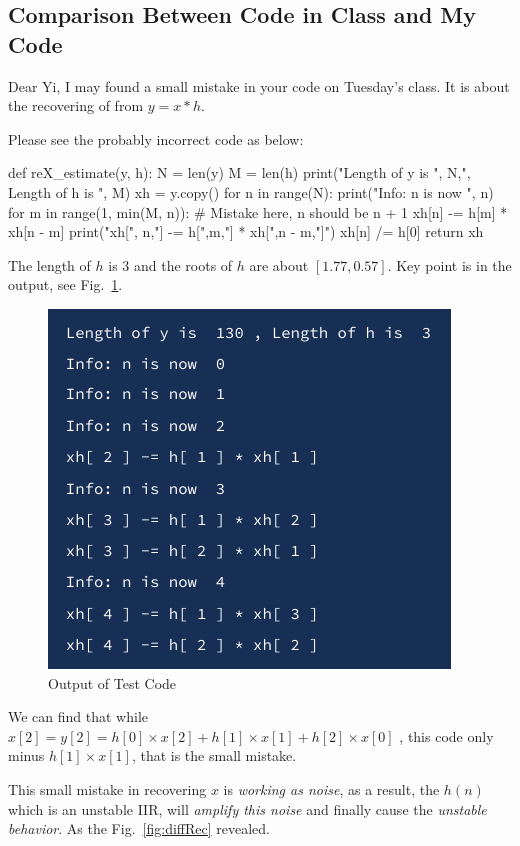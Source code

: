 \documentclass{article}
\begin{document}
\begin{appendices}
\section{Comparison Between Code in Class and My Code}
Dear Yi, I may found a small mistake in your code on Tuesday's class. It is about the recovering of
from $y = x * h$. 

Please see the probably incorrect code as below:
\begin{python}
def reX_estimate(y, h):
	N = len(y)
	M = len(h)
	print("Length of y is ", N,", Length of h is ", M)
	xh = y.copy()
	for n in range(N):
		print("Info: n is now ", n)
		for m in range(1, min(M, n)): # Mistake here, n should be n + 1
			xh[n] -= h[m] * xh[n - m]
			print("xh[", n,"] -= h[",m,"] * xh[",n - m,"]")
		xh[n] /= h[0]
	return xh
\end{python}

The length of $h$ is $3$ and the roots of $h$ are about $[1.77, 0.57]$. Key point is in the output, see Fig.~\ref{fig:output}.

\begin{figure}[!h]
	\centering
	\includegraphics[width=2 in]{../pic/comparisonOutput.png}
	\caption{Output of Test Code}
	\label{fig:output}
\end{figure}

We can find that while $\hat{x}[2] = y[2] = h[0] \times x[2] + h[1]\times x[1] + h[2] \times x[0]$ , this code only minus $h[1] \times x[1]$, that is the small mistake.

This small mistake in recovering $x$ is \emph{working as noise}, as a result, the $h(n)$ which is an unstable IIR, will \emph{amplify this noise} and finally cause the \emph{unstable behavior}. As the Fig.~\ref{fig:diffRec} revealed.


\end{appendices}
\end{document}

